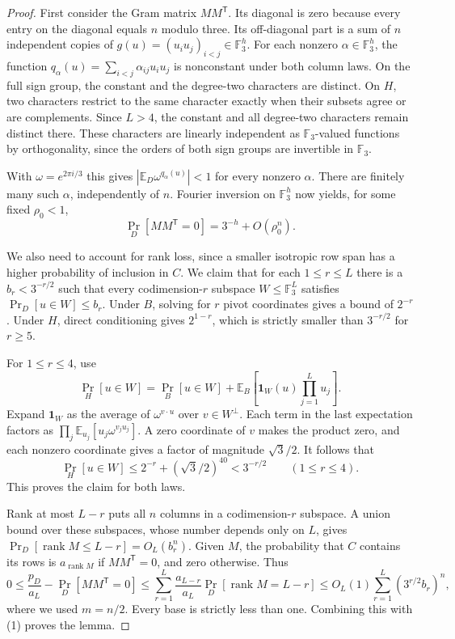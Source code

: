 \documentclass[11pt]{article}
\newcommand{\F}{\mathbb F_3}
\newcommand{\E}{\mathbb E}
\newcommand{\rank}{\operatorname{rank}}
\begin{document}
\begin{proof}
First consider the Gram matrix $MM^{\mathsf T}$. Its diagonal is zero
because every entry on the diagonal equals $n$ modulo three. Its
off-diagonal part is a sum of $n$ independent copies of
$g(u)=(u_i u_j)_{i<j}\in\F^h$. For each nonzero $\alpha\in\F^h$,
the function $q_\alpha(u)=\sum_{i<j}\alpha_{ij}u_i u_j$ is nonconstant
under both column laws. On the full sign group, the constant and the
degree-two characters are distinct. On $H$, two characters restrict to
the same character exactly when their subsets agree or are complements.
Since $L>4$, the constant and all degree-two characters remain distinct
there. These characters are linearly independent as $\F$-valued
functions by orthogonality, since the orders of both sign groups are
invertible in $\F$.

With $\omega=e^{2\pi i/3}$ this gives
$|\E_D\omega^{q_\alpha(u)}|<1$ for every nonzero $\alpha$. There
are finitely many such $\alpha$, independently of $n$. Fourier
inversion on $\F^h$ now yields, for some fixed $\rho_0<1$,
\[
 \Pr_D[MM^{\mathsf T}=0]=3^{-h}+O(\rho_0^n).
 \tag{1}
\]

We also need to account for rank loss, since a smaller isotropic row
span has a higher probability of inclusion in $C$. We claim that for
each $1\le r\le L$ there is a $b_r<3^{-r/2}$ such that every
codimension-$r$ subspace $W\le\F^L$ satisfies $\Pr_D[u\in W]\le b_r$.
Under $B$, solving for $r$ pivot coordinates gives a bound of $2^{-r}$.
Under $H$, direct conditioning gives $2^{1-r}$, which is strictly
smaller than $3^{-r/2}$ for $r\ge5$.

For $1\le r\le4$, use
\[
 \Pr_H[u\in W]=\Pr_B[u\in W]
   +\E_B\!\left[\mathbf 1_W(u)\prod_{j=1}^L u_j\right].
\]
Expand $\mathbf 1_W$ as the average of $\omega^{v\cdot u}$ over
$v\in W^\perp$. Each term in the last expectation factors as
$\prod_j\E_{u_j}[u_j\omega^{v_j u_j}]$. A zero coordinate of $v$
makes the product zero, and each nonzero coordinate gives a factor
of magnitude $\sqrt3/2$. It follows that
\[
 \Pr_H[u\in W]\le 2^{-r}+(\sqrt3/2)^{40}<3^{-r/2}
 \qquad(1\le r\le4).
 \tag{2}
\]
This proves the claim for both laws.

Rank at most $L-r$ puts all $n$ columns in a codimension-$r$ subspace.
A union bound over these subspaces, whose number depends only on $L$,
gives $\Pr_D[\rank M\le L-r]=O_L(b_r^n)$. Given $M$, the probability
that $C$ contains its rows is $a_{\rank M}$ if $MM^{\mathsf T}=0$,
and zero otherwise. Thus
\[
 0\le \frac{p_D}{a_L}-\Pr_D[MM^{\mathsf T}=0]
 \le \sum_{r=1}^L\frac{a_{L-r}}{a_L}\Pr_D[\rank M=L-r]
 \le O_L(1)\sum_{r=1}^L(3^{r/2}b_r)^n,
\]
where we used $m=n/2$. Every base is strictly less than one. Combining
this with (1) proves the lemma.
\end{proof}
\end{document}
